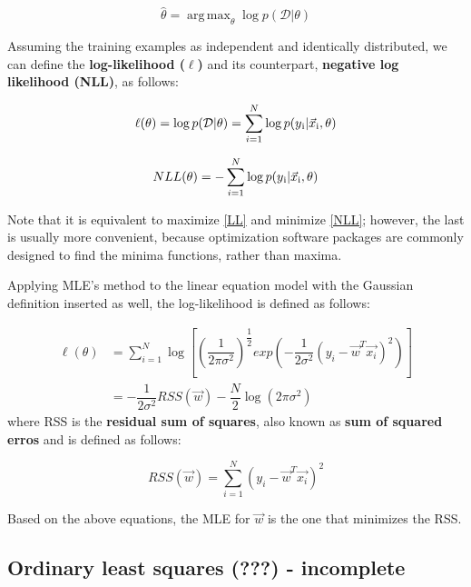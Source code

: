 \documentclass{article}
\DeclareMathOperator*{\argmax}{arg\,max}
\begin{document}
\begin{equation}
\hat{\theta} = \argmax_\theta \log p(\mathcal{D}|\theta)
\end{equation}

Assuming the training examples as independent and identically distributed, we can define the \textbf{log-likelihood ($\ell$)} and its counterpart, \textbf{negative log likelihood (NLL)}, as follows:

\begin{equation}
  \label{LL}
  \ell(\theta) = \log p(\mathcal{D}|\theta) = \sum_{i=1}^{N} \log p(y\textsubscript{i}|\vec{x}\textsubscript{i},\theta)
\end{equation}

\begin{equation}
  \label{NLL}
  NLL(\theta) = - \sum_{i=1}^{N} \log p(y\textsubscript{i}|\vec{x}\textsubscript{i},\theta)
\end{equation}

Note that it is equivalent to maximize \eqref{LL} and minimize \eqref{NLL}; however, the last is usually more convenient, because optimization software packages are commonly designed to find the minima functions, rather than maxima.

Applying MLE's method to the linear equation model with the Gaussian definition inserted as well, the log-likelihood is defined as follows:

\begin{equation}
\begin{split}
\ell(\theta) & = \sum_{i=1}^{N} \log \left[\left(\dfrac{1}{2\pi\sigma^2}\right)^{\dfrac{1}{2}} exp \left( - \dfrac{1}{2\sigma^2}(y_i - \vec{w}^T\vec{x_i})^2 \right) \right] \\
& = - \dfrac{1}{2\sigma^2} RSS(\vec{w}) - \dfrac{N}{2} \log(2\pi\sigma^2)
\end{split}
\end{equation}
where RSS is the \textbf{residual sum of squares}, also known as \textbf{sum of squared erros} and is defined as follows:

\begin{equation}
  RSS(\vec{w}) = \sum_{i=1}^{N} (y_i - \vec{w}^T\vec{x_i})^2
\end{equation}

Based on the above equations, the MLE for $\vec{w}$ is the one that minimizes the RSS.

\subsection{Ordinary least squares (???) - incomplete}
\end{document}
